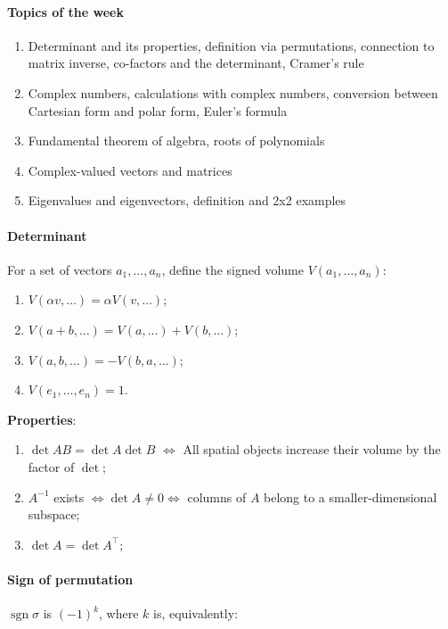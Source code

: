 \documentclass{article}
\begin{document}
\paragraph{Topics of the week} 

\begin{enumerate}
    \item Determinant and its properties, definition via permutations, connection to matrix inverse, co-factors and the determinant, Cramer's rule
    \item Complex numbers, calculations with complex numbers, conversion between Cartesian form and polar form, Euler's formula
    \item Fundamental theorem of algebra, roots of polynomials
    \item Complex-valued vectors and matrices
    \item Eigenvalues and eigenvectors, definition and 2x2 examples
\end{enumerate}

\paragraph{Determinant} For a set of vectors $a_1,\dots,a_n$, define the signed volume $V(a_1,\dots,a_n)$:

\begin{enumerate}
    \item $V(\alpha v, \dots) = \alpha V(v,\dots)$;
    \item $V(a+b, \dots) = V(a,\dots) + V(b,\dots)$;
    \item $V(a,b,\dots) = -V(b,a,\dots)$;
    \item $V(e_1,\dots,e_n) = 1$.
\end{enumerate}

\textbf{Properties}:

\begin{enumerate}
    \item $\det AB = \det A \det B$ $\iff$ All spatial objects increase their volume by the factor of $\det$;
    \item $A^{-1}$ exists $\iff \det A \neq 0 \iff$ columns of $A$ belong to a smaller-dimensional subspace;
    \item $\det A = \det A^\top$;
\end{enumerate}

\paragraph{Sign of permutation} $\operatorname{sgn} \sigma$ is $(-1)^k$, where $k$ is, equivalently:
\end{document}
